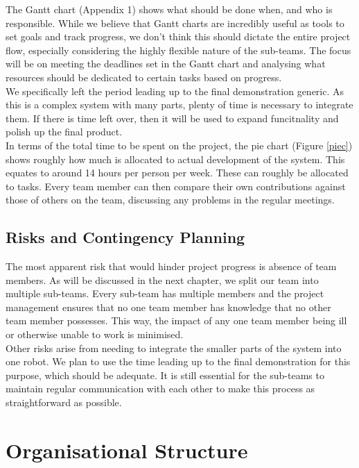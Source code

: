 \documentclass[a4paper,10pt,DIV10,openright,openbib]{scrreprt}
\begin{document}
The Gantt chart (Appendix 1) shows what should be done when, and who is responsible.
While we believe that Gantt charts are incredibly useful as tools to set goals and track
progress, we don't think this should dictate the entire project flow, especially considering
the highly flexible nature of the sub-teams. The focus will be on meeting the deadlines set
in the Gantt chart and analysing what resources should be dedicated to certain
tasks based on progress.\\
We specifically left the period leading up to the final demonstration generic.
As this is a complex system with many parts, plenty of time is necessary to integrate them.
If there is time left over, then it will be used to expand funcitnality and polish up the final product.\\
In terms of the total time to be spent on the project, the pie chart (Figure \ref{piec}) shows roughly how
much is allocated to actual development of the system. This equates to around
14 hours per person per week. These can roughly be allocated to tasks. Every
team member
can then  compare their own contributions against those of others on the team, discussing any
problems in the regular meetings.

\section{Risks and Contingency Planning}
The most apparent risk that would hinder project progress is absence of team members. 
As will be discussed in the next chapter, we split our team into multiple sub-teams. 
Every sub-team has multiple members and the project management ensures that no 
one team member has knowledge that no other 
team member possesses. This way, the impact of any one team member being ill or 
otherwise unable to work is minimised.\\
Other risks arise from needing to integrate 
the smaller parts of the system into one robot. We plan to use the time leading up to the final demonstration 
for this purpose, which should be adequate. It is still essential for the 
sub-teams to maintain regular communication with each other to make this process as straightforward as possible.

{\let\clearpage\relax \chapter{Organisational Structure}}
\end{document}
